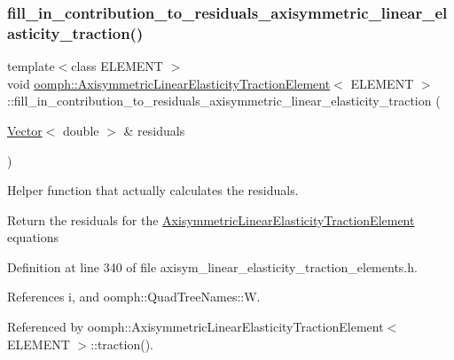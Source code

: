 \subsubsection{\texorpdfstring{fill\+\_\+in\+\_\+contribution\+\_\+to\+\_\+residuals\+\_\+axisymmetric\+\_\+linear\+\_\+elasticity\+\_\+traction()}{fill\_in\_contribution\_to\_residuals\_axisymmetric\_linear\_elasticity\_traction()}}
{\footnotesize\ttfamily template$<$class E\+L\+E\+M\+E\+NT $>$ \\
void \hyperlink{classoomph_1_1AxisymmetricLinearElasticityTractionElement}{oomph\+::\+Axisymmetric\+Linear\+Elasticity\+Traction\+Element}$<$ E\+L\+E\+M\+E\+NT $>$\+::fill\+\_\+in\+\_\+contribution\+\_\+to\+\_\+residuals\+\_\+axisymmetric\+\_\+linear\+\_\+elasticity\+\_\+traction (\begin{DoxyParamCaption}\item[{\hyperlink{classoomph_1_1Vector}{Vector}$<$ double $>$ \&}]{residuals }\end{DoxyParamCaption})\hspace{0.3cm}{\ttfamily [protected]}}



Helper function that actually calculates the residuals. 

Return the residuals for the \hyperlink{classoomph_1_1AxisymmetricLinearElasticityTractionElement}{Axisymmetric\+Linear\+Elasticity\+Traction\+Element} equations 

Definition at line 340 of file axisym\+\_\+linear\+\_\+elasticity\+\_\+traction\+\_\+elements.\+h.



References i, and oomph\+::\+Quad\+Tree\+Names\+::W.



Referenced by oomph\+::\+Axisymmetric\+Linear\+Elasticity\+Traction\+Element$<$ E\+L\+E\+M\+E\+N\+T $>$\+::traction().

\mbox{\label{classoomph_1_1AxisymmetricLinearElasticityTractionElement_a4ec6aee7438ab15aef197407e9c7ef8b}} 
